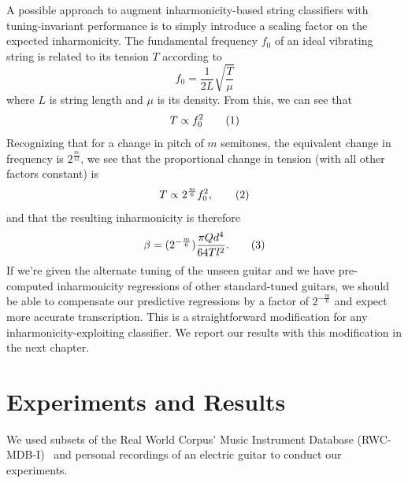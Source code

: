 \documentclass[12pt]{cmuthesis}
\newcommand\addtag{\refstepcounter{equation}\tag{\theequation}}
\begin{document}
A possible approach to augment inharmonicity-based string classifiers with tuning-invariant performance is to simply introduce a scaling factor on the expected inharmonicity. The fundamental frequency $f_0$ of an ideal vibrating string is related to its tension $T$ according to
\begin{equation}
f_0 = \frac{1}{2L}\sqrt{\frac{T}{\mu}}
\end{equation}
where $L$ is string length and $\mu$ is its density. From this, we can see that
\begin{equation}
T \propto f_0^{2} \addtag
\end{equation}
Recognizing that for a change in pitch of $m$ semitones, the equivalent change in frequency is $2^{\frac{m}{12}}$, we see that the proportional change in tension (with all other factors constant) is
\begin{equation}
T \propto 2^{\frac{m}{6}}f_0^2, \addtag
\end{equation}
and that the resulting inharmonicity is therefore
\begin{equation}
\beta = (2^{-\frac{m}{6}}) \frac{\pi Q d^4}{64 T l^2}. \addtag
\end{equation}
If we're given the alternate tuning of the unseen guitar and we have pre-computed inharmonicity regressions of other standard-tuned guitars, we should be able to compensate our predictive regressions by a factor of $2^{-\frac{m}{6}}$ and expect more accurate transcription. This is a straightforward modification for any inharmonicity-exploiting classifier. We report our results with this modification in the next chapter.

\noindent
\chapter{Experiments and Results}
\label{experiments}

We used subsets of the Real World Corpus' Music Instrument Database (RWC-MDB-I)~\cite{goto2003} and personal recordings of an electric guitar to conduct our experiments. 
\end{document}
